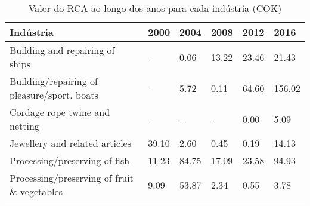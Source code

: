 \begin{table}
\centering
\caption{Valor do RCA ao longo dos anos para cada indústria (COK)}
\label{tab:ex3-tempo-COK}
\begin{tabular}{p{6cm}p{1.5cm}p{1.5cm}p{1.5cm}p{1.5cm}p{1.5cm}}
\toprule
                                  Indústria &  2000 &  2004 &  2008 &  2012 &   2016 \\
\midrule
            Building and repairing of ships &     - &  0.06 & 13.22 & 23.46 &  21.43 \\
Building/repairing of pleasure/sport. boats &     - &  5.72 &  0.11 & 64.60 & 156.02 \\
             Cordage rope twine and netting &     - &     - &     - &  0.00 &   5.09 \\
             Jewellery and related articles & 39.10 &  2.60 &  0.45 &  0.19 &  14.13 \\
              Processing/preserving of fish & 11.23 & 84.75 & 17.09 & 23.58 &  94.93 \\
Processing/preserving of fruit \& vegetables &  9.09 & 53.87 &  2.34 &  0.55 &   3.78 \\
\bottomrule
\end{tabular}
\end{table}
